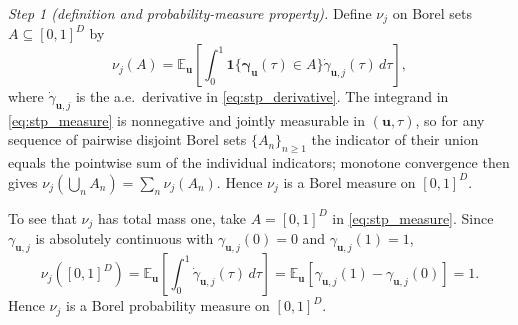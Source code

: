 \emph{Step 1 (definition and probability-measure property).}
Define $\nu_j$ on Borel sets $A\subseteq[0,1]^D$ by
\begin{equation}
\nu_j(A)
=
\mathbb{E}_{\mathbf{u}}\!\left[
\int_0^1
\mathbf{1}\{\boldsymbol{\gamma}_{\mathbf{u}}(\tau)\in A\}
\dot{\gamma}_{\mathbf{u},j}(\tau)\,d\tau
\right],
\label{eq:stp_measure}
\end{equation}
where $\dot{\gamma}_{\mathbf{u},j}$ is the a.e.\ derivative in \eqref{eq:stp_derivative}. The integrand in \eqref{eq:stp_measure} is nonnegative and jointly measurable in $(\mathbf{u},\tau)$, so for any sequence of pairwise disjoint Borel sets $\{A_n\}_{n\ge 1}$ the indicator of their union equals the pointwise sum of the individual indicators; monotone convergence then gives $\nu_j(\bigcup_n A_n)=\sum_n \nu_j(A_n)$. Hence $\nu_j$ is a Borel measure on $[0,1]^D$.

To see that $\nu_j$ has total mass one, take $A=[0,1]^D$ in \eqref{eq:stp_measure}. Since $\gamma_{\mathbf{u},j}$ is absolutely continuous with $\gamma_{\mathbf{u},j}(0)=0$ and $\gamma_{\mathbf{u},j}(1)=1$,
\[
\nu_j([0,1]^D)
=
\mathbb{E}_{\mathbf{u}}\!\left[\int_0^1 \dot{\gamma}_{\mathbf{u},j}(\tau)\,d\tau\right]
=
\mathbb{E}_{\mathbf{u}}\!\left[\gamma_{\mathbf{u},j}(1)-\gamma_{\mathbf{u},j}(0)\right]
=1.
\]
Hence $\nu_j$ is a Borel probability measure on $[0,1]^D$.

